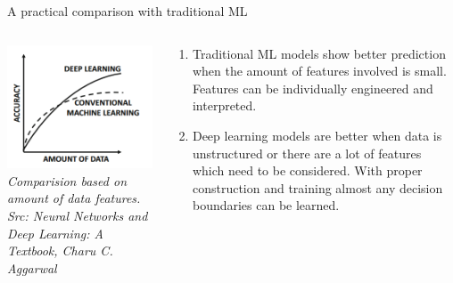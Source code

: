 \begin{frame}{A practical comparison with traditional ML}
    \begin{columns}[T]
    \begin{column}{0.4\textwidth}
      \includegraphics[width=\textwidth]{images/trad vs deep.png}
      \tiny{\textit{Comparision based on amount of data features.\\ Src: Neural Networks and Deep Learning: A Textbook, Charu C. Aggarwal}}
    \end{column}
    \begin{column}{0.6\textwidth}
    \begin{enumerate}[$\bullet$]
    \item Traditional ML models show better prediction when the amount of features involved is small. Features can be individually engineered and interpreted.\pause
    \item Deep learning models are better when data is unstructured or there are a lot of features which need to be considered. With proper construction and training almost any decision boundaries can be learned. 
    \end{enumerate}
    \end{column}
  \end{columns}
\end{frame}

